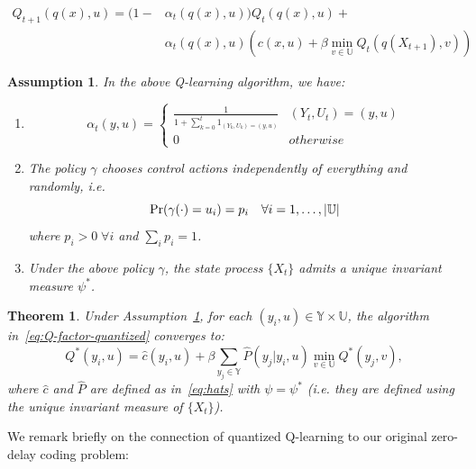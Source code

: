 \documentclass{article}
\newtheorem{theorem}{Theorem}[section]
\newtheorem{assumption}{Assumption}[section]
\begin{document}
\begin{equation}
    \begin{split}
        Q_{t+1}(q(x),u) = (1- & \alpha_t(q(x),u))Q_t(q(x),u) + \\
        & \alpha_t(q(x),u)(c(x,u)+\beta \; \underset{v\in\mathbb{U}}{\text{min}} \; Q_t(q(X_{t+1}),v))\label{eq:Q-factor-quantized}
    \end{split}
\end{equation}

\begin{assumption}\label{assumption:Q-learning} In the above Q-learning algorithm, we have:
    \begin{enumerate}
        \item \[\alpha_t(y,u) = \begin{cases}
                      \frac{1}{1 + \sum_{k=0}^t 1_{(Y_k,U_k) = (y,u)}} & (Y_t,U_t) = (y,u) \\
                      0                                                & otherwise
                  \end{cases}\]
        \item The policy \(\gamma\) chooses control actions independently of everything and randomly, i.e.
              \[ \textup{Pr}(\gamma(\cdot) = u_i) = p_i \quad \forall i = 1,\ldots,|\mathbb{U}| \]
              where \(p_i > 0 \; \forall i\) and \(\sum_i p_i = 1\).
        \item Under the above policy \(\gamma\), the state process \(\{X_t\}\) admits a unique invariant measure \(\psi^*\).
    \end{enumerate}
\end{assumption}

\begin{theorem}\label{theorem:convergence}\cite[Theorem 3.2]{Kara}
    Under Assumption~\ref{assumption:Q-learning}, for each \((y_i,u) \in \mathbb{Y} \times \mathbb{U}\), the algorithm in~\eqref{eq:Q-factor-quantized} converges to:
    \[ Q^*(y_i,u) = \hat{c}(y_i,u) + \beta \sum_{y_j \in \mathbb{Y}}\hat{P}(y_j | y_i,u)\min_{v \in \mathbb{U}}Q^*(y_j,v), \]
    where \(\hat{c}\) and \(\hat{P}\) are defined as in~\eqref{eq:hats} with \(\psi = \psi^*\) (i.e. they are defined using the unique invariant measure of \(\{X_t\}\)).
\end{theorem}

We remark briefly on the connection of quantized Q-learning to our original zero-delay coding problem:
\end{document}
